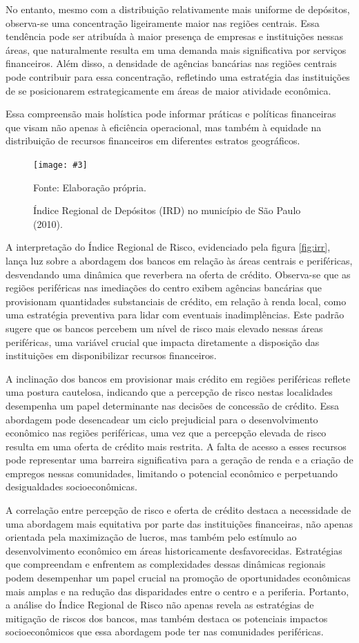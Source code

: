 \documentclass[a4paper,12pt]{article}
\newcommand{\fig}[4]{%
  \begin{figure}[H]
    \centering
    \caption{#1}
    \label{#2}
    \texttt{[image: \#3]}
    
    \vspace{0.5cm}
    
    \begin{footnotesize}
      Fonte: #4
    \end{footnotesize}
  \end{figure}
}
\begin{document}
No entanto, mesmo com a distribuição relativamente mais uniforme de
depósitos, observa-se uma concentração ligeiramente maior nas regiões
centrais. Essa tendência pode ser atribuída à maior presença de empresas
e instituições nessas áreas, que naturalmente resulta em uma demanda
mais significativa por serviços financeiros. Além disso, a densidade de
agências bancárias nas regiões centrais pode contribuir para essa
concentração, refletindo uma estratégia das instituições de se
posicionarem estrategicamente em áreas de maior atividade econômica.

Essa compreensão mais holística pode informar práticas e políticas
financeiras que visam não apenas à eficiência operacional, mas também à
equidade na distribuição de recursos financeiros em diferentes estratos
geográficos.

\fig{Índice Regional de Depósitos (IRD) no município de São Paulo (2010).}{fig:ird}{exports/ird2.pdf}{Elaboração própria.}

A interpretação do Índice Regional de Risco, evidenciado pela figura
\ref{fig:irr}, lança luz sobre a abordagem dos bancos em relação às
áreas centrais e periféricas, desvendando uma dinâmica que reverbera na
oferta de crédito. Observa-se que as regiões periféricas nas imediações
do centro exibem agências bancárias que provisionam quantidades
substanciais de crédito, em relação à renda local, como uma estratégia
preventiva para lidar com eventuais inadimplências. Este padrão sugere
que os bancos percebem um nível de risco mais elevado nessas áreas
periféricas, uma variável crucial que impacta diretamente a disposição
das instituições em disponibilizar recursos financeiros.

A inclinação dos bancos em provisionar mais crédito em regiões
periféricas reflete uma postura cautelosa, indicando que a percepção de
risco nestas localidades desempenha um papel determinante nas decisões
de concessão de crédito. Essa abordagem pode desencadear um ciclo
prejudicial para o desenvolvimento econômico nas regiões periféricas,
uma vez que a percepção elevada de risco resulta em uma oferta de
crédito mais restrita. A falta de acesso a esses recursos pode
representar uma barreira significativa para a geração de renda e a
criação de empregos nessas comunidades, limitando o potencial econômico
e perpetuando desigualdades socioeconômicas.

A correlação entre percepção de risco e oferta de crédito destaca a
necessidade de uma abordagem mais equitativa por parte das instituições
financeiras, não apenas orientada pela maximização de lucros, mas também
pelo estímulo ao desenvolvimento econômico em áreas historicamente
desfavorecidas. Estratégias que compreendam e enfrentem as complexidades
dessas dinâmicas regionais podem desempenhar um papel crucial na
promoção de oportunidades econômicas mais amplas e na redução das
disparidades entre o centro e a periferia. Portanto, a análise do Índice
Regional de Risco não apenas revela as estratégias de mitigação de
riscos dos bancos, mas também destaca os potenciais impactos
socioeconômicos que essa abordagem pode ter nas comunidades periféricas.
\end{document}
